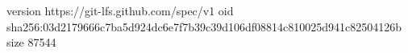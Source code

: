 version https://git-lfs.github.com/spec/v1
oid sha256:03d2179666c7ba5d924dc6e7f7b39c39d106df08814c810025d941c82504126b
size 87544

